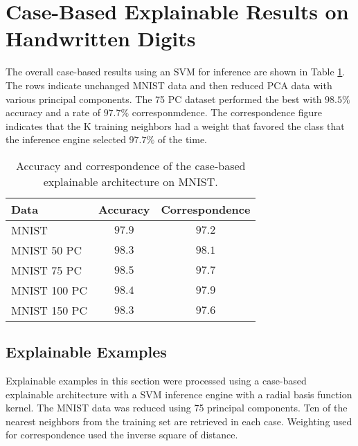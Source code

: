 \section{Case-Based Explainable Results on Handwritten Digits}
\label{sec:case_based_handwriting_results}

The overall case-based results using an SVM for inference are shown in Table
\ref{tab:mnist_case_based_results}. The rows indicate unchanged MNIST data and
then reduced PCA data with various principal components. The 75 PC dataset
performed the best with $98.5\%$ accuracy and a rate of $97.7\%$
corresponmdence. The correspondence figure indicates that the K training
neighbors had a weight that favored the class that the inference engine selected
$97.7\%$ of the time.


\begin{table}[H]
    \renewcommand{\arraystretch}{1.3}
    \caption{Accuracy and correspondence of the case-based explainable architecture on MNIST.}
    \begin{center}
    \begin{tabular}{|l|c|c|}
        \hline
        Data & Accuracy & Correspondence \\
        \hline
        \hline
        MNIST & $97.9$ & $97.2$ \\
        \hline
        MNIST 50 PC & $98.3$ & $98.1$ \\
        \hline
        MNIST 75 PC & $98.5$ & $97.7$  \\
        \hline
        MNIST 100 PC & $98.4$ & $97.9$  \\
        \hline
        MNIST 150 PC & $98.3$ & $97.6$  \\
        \hline
    \end{tabular}
    \end{center}
    \label{tab:mnist_case_based_results}
\end{table}

\subsection{Explainable Examples}
\label{sec:case_based_explainable_examples}

Explainable examples in this section were processed using a case-based
explainable architecture with a SVM inference engine with a radial basis function
kernel.  The MNIST data was reduced using 75 principal components.  Ten of the
nearest neighbors from the training set are retrieved in each case. Weighting
used for correspondence used the inverse square of distance.


